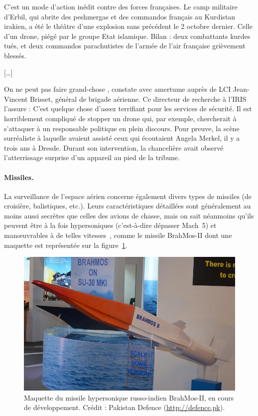 	\begin{displayquote}
	C'est un mode d'action inédit contre des forces françaises. Le camp militaire d'Erbil, qui abrite des peshmergas et des commandos français au Kurdistan irakien, a été le théâtre d'une explosion sans précédent le 2 octobre dernier. Celle d'un drone, piégé par le groupe Etat islamique. Bilan : deux combattants kurdes tués, et deux commandos parachutistes de l'armée de l'air française grièvement blessés.
	
	[\ldots{}]
	
	\og On ne peut pas faire grand-chose \fg{}, constate avec amertume auprès de LCI Jean-Vincent Brisset, général de brigade aérienne. Ce directeur de recherche à l’IRIS l'assure : \og C'est quelque chose d'assez terrifiant pour les services de sécurité. Il est horriblement compliqué de stopper un drone qui, par exemple, chercherait à s'attaquer à un responsable politique en plein discours. \fg{} Pour preuve, la scène surréaliste à laquelle avaient assisté ceux qui écoutaient Angela Merkel, il y a trois ans à Dresde. Durant son intervention, la chancelière avait observé l’atterrissage surprise d’un appareil au pied de la tribune.~\cite{brisset}

	
	\end{displayquote}
	
	\paragraph{Missiles.}
	La surveillance de l'espace aérien concerne également divers types de missiles (de croisière, balistiques, etc.). Leurs caractéristiques détaillées sont généralement au moins aussi secrètes que celles des avions de chasse, mais on sait néanmoins qu'ils peuvent être à la fois hypersoniques (c'est-à-dire dépasser Mach~5) et manœuvrables à de telles vitesses~\cite{missiles}, comme le missile BrahMos-II dont une maquette est représentée sur la figure~\ref{fig:brahmos}.
	
	\begin{figure}[htb]
		\centering
		\includegraphics[width=\textwidth]{figures/brahmos-II}
		\caption{Maquette du missile hypersonique russo-indien BrahMos-II, en cours de développement. Crédit : Pakistan Defence (\url{http://defence.pk}).}
		\label{fig:brahmos}
	\end{figure}
	
